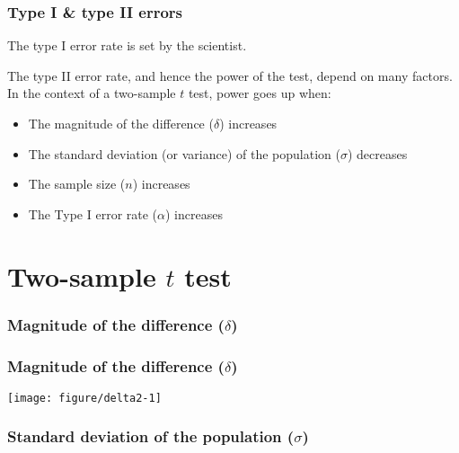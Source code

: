 \documentclass[color=usenames,dvipsnames]{beamer}\usepackage[]{graphicx}\usepackage[]{color}
\begin{document}
\begin{frame}
  \frametitle{Type I \& type II errors}
  {%
    The \alert{type I error rate} is set by the scientist.} \par
  \pause
  \vfill
  {%
    The \alert{type II error rate}, and hence the power of the test, depend
    on many factors.}
  \pause
  \vfill
  {%
    In the context of a two-sample $t$ test, power goes up when:} %
  \begin{itemize}[<+->]%
    \item The magnitude of the difference ($\delta$) increases
    \item The standard deviation (or variance) of the population
      ($\sigma$) decreases
    \item The sample size ($n$) increases
    \item The Type I error rate ($\alpha$) increases
  \end{itemize}
\end{frame}




\section{Two-sample $t$ test}



\begin{frame}[fragile]
  \frametitle{Magnitude of the difference ($\delta$)}


\end{frame}




\begin{frame}[fragile]
  \frametitle{Magnitude of the difference ($\delta$)}
\texttt{[image: figure/delta2-1]}
\end{frame}








\begin{frame}[fragile]
  \frametitle{Standard deviation of the population ($\sigma$)}


\end{frame}
\end{document}
